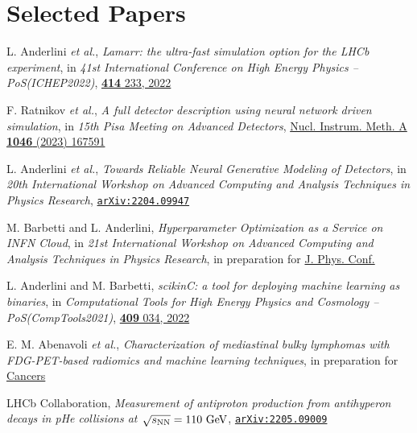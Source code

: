 \newcommand{\arxiv}[1]
  {\href{https://arxiv.org/abs/#1}{\texttt{arXiv:#1}}}


\section*{Selected Papers}
\begin{cvcontent}
 \begin{enumerate}[label={[\arabic*]}, leftmargin=1cm]
    \item \label{item:lamarr-ichep} L. Anderlini \emph{et al.},
    \emph{Lamarr: the ultra-fast simulation option for the LHCb experiment},
    in \emph{41st International Conference on High Energy Physics -- PoS(ICHEP2022)},
    \href{https://doi.org/10.22323/1.414.0233}{\textbf{414} 233, 2022}
    \item \label{item:gan-pm} F. Ratnikov \emph{et al.},
    \emph{A full detector description using neural network driven simulation},
    in \emph{15th Pisa Meeting on Advanced Detectors},
    \href{https://doi.org/10.1016/j.nima.2022.167591}{Nucl. Instrum. Meth. A \textbf{1046} (2023) 167591}
    \sloppy
    \item \label{item:gan-acat} L. Anderlini \emph{et al.},
    \emph{Towards Reliable Neural Generative Modeling of Detectors},
    in \emph{20th International Workshop on Advanced Computing and Analysis Techniques in Physics Research},
    \arxiv{2204.09947}
    \item \label{item:hopaas} M. Barbetti and L. Anderlini,
    \emph{Hyperparameter Optimization as a Service on INFN Cloud},
    in \emph{21st International Workshop on Advanced Computing and Analysis Techniques in Physics Research},
    in preparation for \href{https://iopscience.iop.org/journal/1742-6596}{J. Phys. Conf.}
    \item \label{item:scikinc} L. Anderlini and M. Barbetti, 
    \emph{scikinC: a tool for deploying machine learning as binaries}, 
    in \emph{Computational Tools for High Energy Physics and Cosmology -- PoS(CompTools2021)}, 
    \href{https://doi.org/10.22323/1.409.0034}{\textbf{409} 034, 2022}
    \item \label{item:phys-med} E. M. Abenavoli \emph{et al.},
    \emph{Characterization of mediastinal bulky lymphomas with FDG-PET-based radiomics and machine learning techniques},
    in preparation for \href{https://www.mdpi.com/journal/cancers}{Cancers}
    \item \label{item:smog-pub} LHCb Collaboration,
    \emph{Measurement of antiproton production from antihyperon decays in pHe collisions at $\sqrt{s_{\rm{NN}}}=110~\rm{GeV}$},
    \arxiv{2205.09009}
 \end{enumerate}
\end{cvcontent}